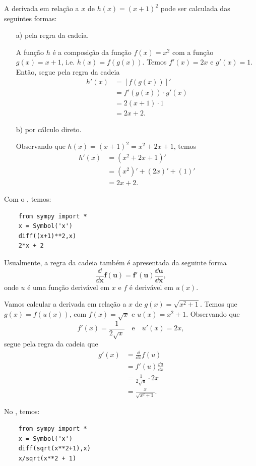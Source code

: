 \begin{ex}
  A derivada em relação a $x$ de $h(x) = (x+1)^2$ pode ser calculada das seguintes formas:
  \begin{enumerate}
  \item[a)] pela regra da cadeia.

    A função $h$ é a composição da função $f(x)=x^2$ com a função $g(x)=x+1$, i.e. $h(x) = f(g(x))$. Temos $f'(x)=2x$ e $g'(x)=1$. Então, segue pela regra da cadeia
    \begin{align}
      h'(x) &= [f(g(x))]' \\
            &= f'(g(x))\cdot g'(x) \\
            &= 2(x+1)\cdot 1 \\
            &= 2x+2.
    \end{align}

  \item[b)] por cálculo direto.

    Observando que $h(x)=(x+1)^2=x^2+2x+1$, temos
    \begin{align}
      h'(x) &= (x^2+2x+1)' \\
            &= (x^2)' + (2x)' + (1)' \\
            &= 2x + 2.
    \end{align}
  \end{enumerate}

  \ifispython
  Com o \sympy, temos:
  \begin{lstlisting}
    from sympy import *
    x = Symbol('x')
    diff((x+1)**2,x)
    2*x + 2
  \end{lstlisting}
  \fi  
\end{ex}

Usualmente, a regra da cadeia também é apresentada da seguinte forma
\begin{equation}\label{eq:deriv_regra_da_cadeia}
  \pmb{\frac{\dd}{\dd x}f(u) = f'(u)\frac{\dd u}{\dd x}},
\end{equation}
onde $u$ é uma função derivável em $x$ e $f$ é derivável em $u(x)$.

\begin{ex}
  Vamos calcular a derivada em relação a $x$ de $g(x) = \sqrt{x^2+1}$. Temos que $g(x) = f(u(x))$, com $f(x) = \sqrt{x}$ e $u(x) = x^2+1$. Observando que
  \begin{equation}
    f'(x) = \frac{1}{2\sqrt{x}}\quad\text{e}\quad u'(x)=2x,
  \end{equation}
  segue pela regra da cadeia que
  \begin{align}
    g'(x) &= \frac{\dd}{\dd x}f(u) \\
          &= f'(u)\frac{\dd u}{\dd x} \\
          &= \frac{1}{2\sqrt{u}}\cdot 2x \\
          &= \frac{x}{\sqrt{x^2+1}}.
  \end{align}

  \ifispython
  No \sympy, temos:
\begin{lstlisting}
    from sympy import *
    x = Symbol('x')
    diff(sqrt(x**2+1),x)
    x/sqrt(x**2 + 1)
  \end{lstlisting}
  \fi  
\end{ex}

